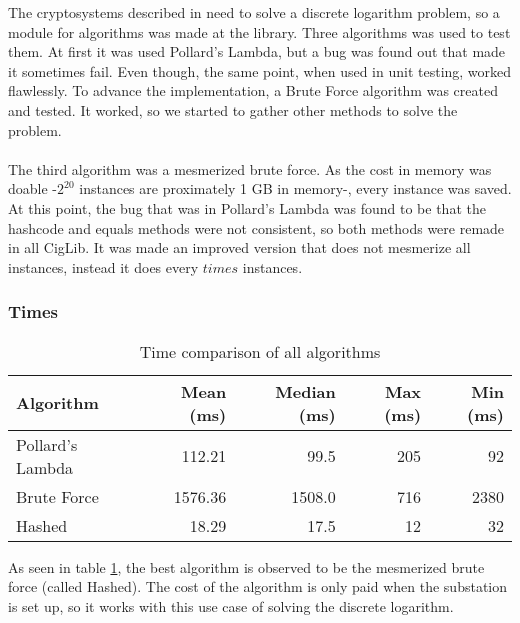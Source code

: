 
	The cryptosystems described in \cite{recsi, busom} need to solve a discrete logarithm
	problem, so a module for algorithms was made at the library.
	Three algorithms was used to test them. At first it was used Pollard's
	Lambda, but a bug was found out that made it sometimes fail. Even though, 
	 the same point, when used in unit testing, worked flawlessly. To advance the
	implementation, a Brute Force algorithm was created and tested.
	It worked, so we started to gather other methods to solve the problem.\\
	\\
	The third algorithm was a mesmerized brute force. As the cost in memory was
	doable -$2^{20}$ instances are proximately 1 GB in memory-, every instance was saved. At this point, the bug that was in Pollard's
	Lambda was found to be that the hashcode and equals methods were not consistent, so both methods were remade in all CigLib. It was made an improved version that does not mesmerize all instances, instead it does every $times$ instances.
	\subsubsection{Times}
	\begin{table}[h]
		\centering
	\begin{tabular}{l|rrrr}
		Algorithm &  Mean (ms) & Median (ms) & Max (ms) &Min (ms)\\ 
		\hline 
		Pollard's Lambda&112.21&99.5&205&92  \\
		Brute Force &1576.36 &1508.0 &716 &2380\\
		Hashed &18.29 &17.5 &12 &32
		

	\end{tabular}
	\caption{Time comparison of all algorithms}
	\label{wrap:time}
	\end{table}
	As seen in table \ref{wrap:time},
	the best algorithm is observed to be the mesmerized brute force (called Hashed).
	The cost of the algorithm is only paid when the substation is set up, so it works with this use case of solving the discrete logarithm.
